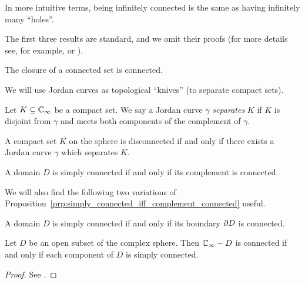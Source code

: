 In more intuitive terms, being infinitely connected is the same as having
infinitely many \enquote{holes}.

The first three results are standard, and we omit their proofs (for more details
see, for example, \cite{Ahlfors1979} or \cite{Newman1939}).

\begin{proposition}
    The closure of a connected set is connected.
\end{proposition}

We will use Jordan curves as topological \enquote{knives} (to separate compact
sets).

\begin{definition}
    Let $K \subseteq \mathbb{C}_\infty$ be a compact set. We say a Jordan curve $\gamma$
    \emph{separates} $K$ if $K$ is disjoint from $\gamma$ and meets both
    components of the complement of $\gamma$.
\end{definition}

\begin{proposition}
    A compact set $K$ on the sphere is disconnected if and only if there exists
    a Jordan curve $\gamma$ which separates $K$.
\end{proposition}

\begin{proposition}
    \label{prp:simply_connected_iff_complement_connected}
    A domain $D$ is simply connected if and only if its complement is connected.
\end{proposition}

We will also find the following two variations of
Proposition~\ref{prp:simply_connected_iff_complement_connected} useful.

\begin{proposition}[Simply connected domain $\iff$ boundary connected $\iff$ $c(D)=1$]
    A domain $D$ is simply connected if and only if its boundary $\partial {D}$
    is connected.
\end{proposition}

\begin{proposition}
    \label{prp:complement_open_set_connected_iff_components_simply_connected}
    Let $D$ be an open subset of the complex sphere. Then $\mathbb{C}_\infty - D$ is
    connected if and only if each component of $D$ is simply connected.
\end{proposition}
\begin{proof}
    See \cite[81]{Beardon1991}.
\end{proof}

